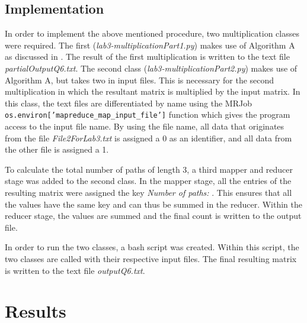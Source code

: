 \documentclass[10pt,twocolumn]{witseiepaper}
\begin{document}
\subsection{Implementation} 
In order to implement the above mentioned procedure, two multiplication classes were required. The first (\textit{lab3-multiplicationPart1.py}) makes use of Algorithm A as discussed in . The result of the first multiplication is written to the text file \textit{partialOutputQ6.txt}. The second class (\textit{lab3-multiplicationPart2.py}) makes use of Algorithm A, but takes two in input files. This is necessary for the second multiplication in which the resultant matrix is multiplied by the input matrix. In this class, the text files are differentiated by name using the MRJob \texttt{os.environ['mapreduce\_map\_input\_file']} function which gives the program access to the input file name. By using the file name, all data that originates from the file \textit{File2ForLab3.txt} is assigned a 0 as an identifier, and all data from the other file is assigned a 1.

To calculate the total number of paths of length 3, a third mapper and reducer stage was added to the second class. In the mapper stage, all the entries of the resulting matrix were assigned the key \textit{Number of paths: }. This ensures that all the values have the same key and can thus be summed in the reducer. Within the reducer stage, the values are summed and the final count is written to the output file.

In order to run the two classes, a bash script was created. Within this script, the two classes are called with their respective input files. The final resulting matrix is written to the text file \textit{outputQ6.txt}. 

\section{Results}


%
\end{document}
